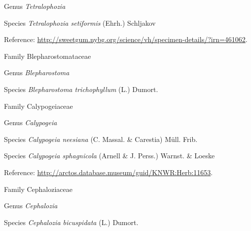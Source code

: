 \documentclass[9pt, article]{memoir}
\begin{document}
\begin{multicols}{2}
\vspace{6pt}\noindent\hspace{30pt}Genus \textit{Tetralophozia}


\vspace{6pt}\noindent\hspace{36pt}Species \textit{Tetralophozia setiformis} (Ehrh.) Schljakov


\vspace{6pt}Reference: 
\url{http://sweetgum.nybg.org/science/vh/specimen-details/?irn=461062}.

\vspace{6pt}\noindent\hspace{24pt}Family Blepharostomataceae


\vspace{6pt}\noindent\hspace{30pt}Genus \textit{Blepharostoma}


\vspace{6pt}\noindent\hspace{36pt}Species \textit{Blepharostoma trichophyllum} (L.) Dumort.


\vspace{6pt}\noindent\hspace{24pt}Family Calypogeiaceae


\vspace{6pt}\noindent\hspace{30pt}Genus \textit{Calypogeia}


\vspace{6pt}\noindent\hspace{36pt}Species \textit{Calypogeia neesiana} (C. Massal. \& Carestia) Müll. Frib.


\vspace{6pt}\noindent\hspace{36pt}Species \textit{Calypogeia sphagnicola} (Arnell \& J. Perss.) Warnst. \& Loeske


\vspace{6pt}Reference: 
\url{http://arctos.database.museum/guid/KNWR:Herb:11653}.

\vspace{6pt}\noindent\hspace{24pt}Family Cephaloziaceae


\vspace{6pt}\noindent\hspace{30pt}Genus \textit{Cephalozia}


\vspace{6pt}\noindent\hspace{36pt}Species \textit{Cephalozia bicuspidata} (L.) Dumort.



\end{multicols}
\end{document}
